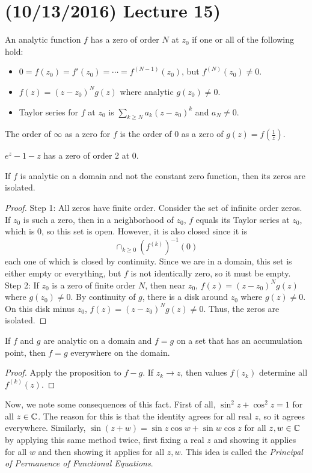 \documentclass[11pt,leqno,oneside]{amsart}
\begin{document}
  \section{(10/13/2016) Lecture 15)}
  \begin{defn}
    An analytic function $f$ has a zero of order $N$ at $z_0$ if one
    or all of the following hold:
    \begin{itemize}
    \item $0 = f(z_0) = f'(z_0) = \cdots = f^{(N-1)}(z_0)$, but
      $f^{(N)}(z_0) \neq 0$.
    \item $f(z) = (z-z_0)^N g(z)$ where analytic $g(z_0) \neq 0$.
    \item Taylor series for $f$ at $z_0$ is $\sum_{k \geq N}
      a_k(z-z_0)^k$ and $a_N \neq 0$.
    \end{itemize}
    The order of $\infty$ as a zero for $f$ is the order of 0 as a  zero
    of $g(z) = f(\frac{1}{z})$.
  \end{defn}
  \begin{example}
    $e^z-1-z$ has a zero of order 2 at 0.
  \end{example}
  \begin{prop}
    If $f$ is analytic on a domain and not the constant zero function,
    then its zeros are isolated.
  \end{prop}
  \begin{proof}
    Step 1: All zeros have finite order. Consider the set of infinite
    order zeros. If $z_0$ is such a zero, then in a neighborhood of
    $z_0$, $f$ equals its Taylor series at $z_0$, which is 0, so this
    set is open. However, it is also closed since it is \[
      \cap_{k \geq 0} (f^{(k)})^{-1}(0)
    \]
    each one of which is closed by continuity. Since we are in a
    domain, this set is either empty or everything, but $f$ is not
    identically zero, so it must be empty.\\
    Step 2: If $z_0$ is a zero of finite order $N$, then near $z_0$,
    $f(z) = (z-z_0)^N g(z)$ where $g(z_0) \neq 0$. By continuity of $g$,
    there is a disk around $z_0$ where $g(z) \neq 0$. On this disk
    minus $z_0$, $f(z) = (z-z_0)^N g(z) \neq 0$. Thus, the zeros are
    isolated.
  \end{proof}
  \begin{cor}
    If $f$ and $g$ are analytic on a domain and $f=g$ on a set that
    has an accumulation point, then $f=g$ everywhere on the domain.
  \end{cor}
  \begin{proof}
    Apply the proposition to $f-g$. If $z_k \to z$, then values
    $f(z_k)$ determine all $f^{(k)}(z)$.
  \end{proof}
  Now, we note some consequences of this fact. First of all, $\sin^2 z
  + \cos^2 z = 1$ for all $z \in {\mathbb C}$. The reason for this is that the
  identity agrees for all real $z$, so it agrees
  everywhere. Similarly, $\sin(z+w) = \sin z \cos w + \sin w \cos z$
  for all $z,w \in {\mathbb C}$ by applying this same method twice, first
  fixing a real $z$ and showing it applies for all $w$ and then
  showing it applies for all $z,w$. This idea is called the
  \emph{Principal of Permanence of Functional Equations}.
\end{document}

